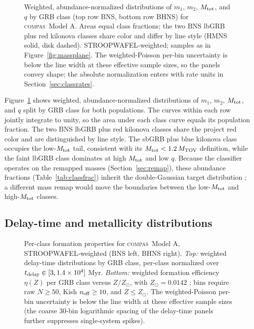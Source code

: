 \documentclass[twocolumn,amsmath]{aastex702}
\newcommand{\Mtov}{M_{\rm TOV}}
\newcommand{\Mtot}{M_{\rm tot}}
\newcommand{\compas}{\textsc{compas}}
\newcommand{\Zsun}{Z_\odot}
\begin{document}
\begin{figure}[tbp]
\caption{Weighted, abundance-normalized distributions of $m_1$, $m_2$, $\Mtot$,
and $q$ by GRB class (top row BNS, bottom row BHNS) for \compas\ Model A. Areas
equal class fractions; the two BNS lbGRB plus red kilonova classes share color and
differ by line style (HMNS solid, disk dashed). STROOPWAFEL-weighted; samples as
in Figure~\ref{fig:massplane}. The weighted-Poisson per-bin uncertainty is below
the line width at these effective sample sizes, so the panels convey shape; the
absolute normalization enters with rate units in Section~\ref{sec:classrates}.
\label{fig:massdist}}
\end{figure}

Figure~\ref{fig:massdist} shows weighted, abundance-normalized distributions of
$m_1$, $m_2$, $\Mtot$, and $q$ split by GRB class for both populations. The
curves within each row jointly integrate to unity, so the area under each class
curve equals its population fraction. The two BNS lbGRB plus red kilonova classes
share the project red color and are distinguished by line style. The sbGRB plus
blue kilonova class occupies the low-$\Mtot$ tail, consistent with its
$\Mtot < 1.2\,\Mtov$ definition, while the faint lbGRB class dominates at high
$\Mtot$ and low $q$. Because the classifier operates on the remapped masses
(Section~\ref{sec:remap}), these abundance fractions
(Table~\ref{tab:classfrac}) inherit the \citet{alsing2018} double-Gaussian
target distribution \citep{mandel2020}; a different mass remap would move the
boundaries between the low-$\Mtot$ and high-$\Mtot$ classes.

\subsection{Delay-time and metallicity distributions} \label{sec:delaytime}

\begin{figure}[tbp]
\par\medskip
{}
\caption{Per-class formation properties for \compas\ Model A,
STROOPWAFEL-weighted (BNS left, BHNS right). \textit{Top:} weighted delay-time
distributions by GRB class, per-class normalized over
$t_{\rm delay} \in [3, 1.4\times10^4]$ Myr. \textit{Bottom:} weighted formation
efficiency $\eta(Z)$ per GRB class versus $Z/\Zsun$, with $\Zsun = 0.0142$
\citep{asplund2009}; bins require raw $N \geq 50$, Kish $n_{\rm eff} \geq 10$,
and $Z \leq \Zsun$. The weighted-Poisson per-bin uncertainty is below the line
width at these effective sample sizes (the coarse 30-bin logarithmic spacing of
the delay-time panels further suppresses single-system spikes).
\label{fig:delaytime}}
\end{figure}
\end{document}
